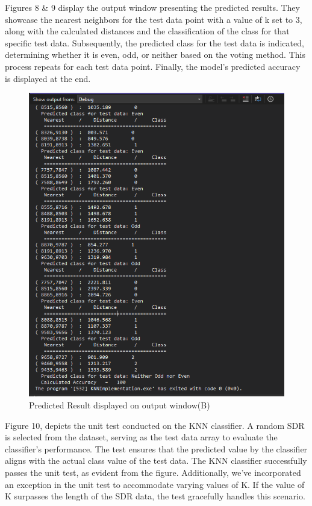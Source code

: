 \documentclass[conference]{IEEEtran}
\begin{document}
Figures 8 \& 9 display the output window presenting the predicted results. They showcase the nearest neighbors for the test data point with a value of k set to 3, along with the calculated distances and the classification of the class for that specific test data. Subsequently, the predicted class for the test data is indicated, determining whether it is even, odd, or neither based on the voting method. This process repeats for each test data point. Finally, the model's predicted accuracy is displayed at the end.

\begin{figure}
    \centering
    \includegraphics[width=1.0\linewidth]{Picture2.png}
    \caption{Predicted Result displayed on output window(B)}
    \label{fig:enter-label}
\end{figure}

Figure 10, depicts the unit test conducted on the KNN classifier. A random SDR is selected from the dataset, serving as the test data array to evaluate the classifier's performance. The test ensures that the predicted value by the classifier aligns with the actual class value of the test data. The KNN classifier successfully passes the unit test, as evident from the figure. Additionally, we've incorporated an exception in the unit test to accommodate varying values of K. If the value of K surpasses the length of the SDR data, the test gracefully handles this scenario.
\end{document}
